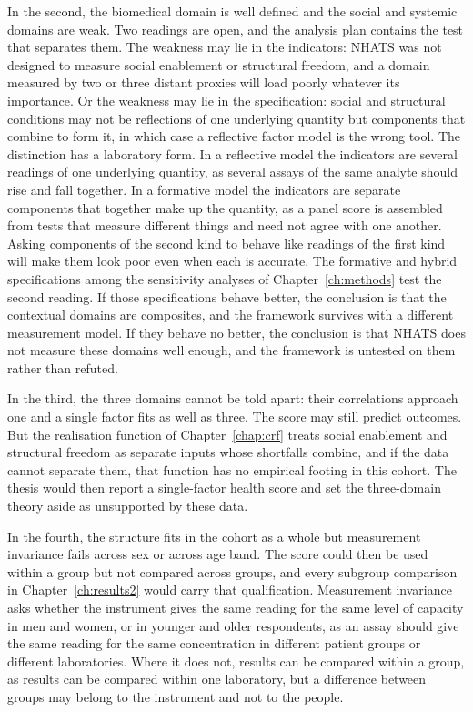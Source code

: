In the second, the biomedical domain is well defined and the social and systemic
domains are weak. Two readings are open, and the analysis plan contains the test
that separates them. The weakness may lie in the indicators: NHATS was not designed
to measure social enablement or structural freedom, and a domain measured by two or
three distant proxies will load poorly whatever its importance. Or the weakness may
lie in the specification: social and structural conditions may not be reflections
of one underlying quantity but components that combine to form it, in which case a
reflective factor model is the wrong tool. The distinction has a laboratory form.
In a reflective model the indicators are several readings of one underlying
quantity, as several assays of the same analyte should rise and fall together. In
a formative model the indicators are separate components that together make up
the quantity, as a panel score is assembled from tests that measure different
things and need not agree with one another. Asking components of the second kind
to behave like readings of the first kind will make them look poor even when each
is accurate. The formative and hybrid specifications
among the sensitivity analyses of Chapter~\ref{ch:methods} test the second reading.
If those specifications behave better, the conclusion is that the contextual
domains are composites, and the framework survives with a different measurement
model. If they behave no better, the conclusion is that NHATS does not measure these
domains well enough, and the framework is untested on them rather than refuted.

In the third, the three domains cannot be told apart: their correlations approach
one and a single factor fits as well as three. The score may still predict
outcomes. But the realisation function of Chapter~\ref{chap:crf} treats social
enablement and structural freedom as separate inputs whose shortfalls combine, and
if the data cannot separate them, that function has no empirical footing in this
cohort. The thesis would then report a single-factor health score and set the
three-domain theory aside as unsupported by these data.

In the fourth, the structure fits in the cohort as a whole but measurement
invariance \citep{meredith_1993,vandenberg_lance_2000} fails across sex or across
age band. The score could then be used within a group but not compared across
groups, and every subgroup comparison in Chapter~\ref{ch:results2} would carry that
qualification. Measurement invariance asks whether the instrument gives the same
reading for the same level of capacity in men and women, or in younger and older
respondents, as an assay should give the same reading for the same concentration
in different patient groups or different laboratories. Where it does not, results
can be compared within a group, as results can be compared within one laboratory,
but a difference between groups may belong to the instrument and not to the
people.

